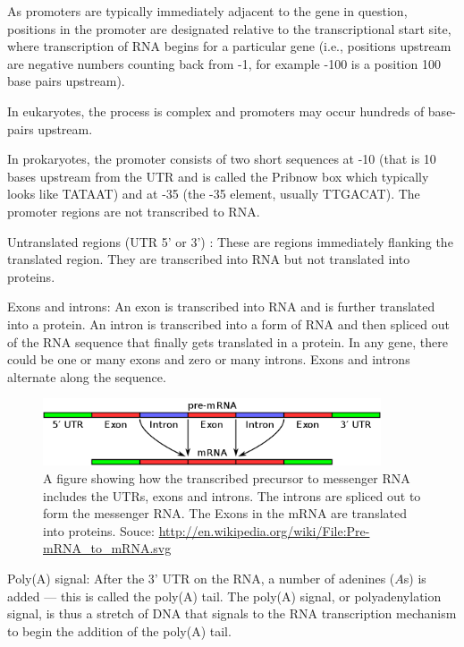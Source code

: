 \documentclass[11pt]{article}
\begin{document}
As promoters are typically immediately adjacent to the gene in question, positions in the promoter are designated relative to the transcriptional start site, where transcription of RNA begins for a particular gene (i.e., positions upstream are negative numbers counting back from -1, for example -100 is a position 100 base pairs upstream).

In eukaryotes, the process is complex and promoters may occur hundreds of base-pairs upstream.

In prokaryotes, the promoter consists of two short sequences at -10 (that is 10 bases upstream from the UTR and is called the Pribnow box which typically looks like TATAAT) and at -35 (the -35 element, usually TTGACAT).  The promoter regions are not transcribed to RNA.

Untranslated regions (UTR 5' or 3') :  These are  regions immediately flanking the translated region.   They are transcribed into RNA but not translated into proteins.  

Exons and introns: An exon is transcribed into RNA and is further translated into a protein.  An intron is transcribed into a form of RNA and then spliced out of the RNA sequence that finally gets translated in a protein.  In any gene, there could be one or many exons and zero or many introns.  Exons and introns alternate along the sequence.  

\begin{figure}[h]
\includegraphics[width=10cm]{figures/exonintron}
\caption{A figure showing how the transcribed precursor to messenger RNA includes the UTRs, exons and introns.  The introns are spliced out to form  the messenger RNA.  The Exons in the mRNA are translated into proteins. Souce: \url{http://en.wikipedia.org/wiki/File:Pre-mRNA_to_mRNA.svg} }
\label{fig:exon}
\end{figure}


Poly(A) signal: After the 3' UTR on the RNA, a number of  adenines ($A$s) is added  --- this is called the poly(A) tail.  The poly(A) signal, or polyadenylation signal, is thus a stretch of DNA that signals to the RNA transcription mechanism to begin the addition of the poly(A) tail.  
\end{document}
